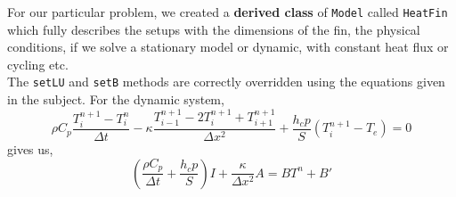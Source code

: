 \documentclass{article}
\begin{document}
For our particular problem, we created a \textbf{derived class} of \texttt{Model} called \texttt{HeatFin} which fully describes the setups with the dimensions of the fin, the physical conditions, if we solve a stationary model or dynamic, with constant heat flux or cycling etc.\\

The \texttt{setLU} and \texttt{setB} methods are correctly overridden using the equations given in the subject. For the dynamic system,\\
\begin{equation}\label{eq:heat_equation}
\rho C_p \frac{T_{i}^{n+1} - T_{i}^{n}}{\Delta t} - \kappa \frac{T_{i-1}^{n+1} - 2T_{i}^{n+1} + T_{i+1}^{n+1}}{\Delta x^2} + \frac{h_c p}{S} (T_i^{n+1} - T_e) = 0 
\end{equation}
gives us,
\begin{equation}\label{eq:matrix_equation}
\left(\frac{\rho C_p}{\Delta t} + \frac{h_c p}{S}\right) I + \frac{\kappa}{\Delta x^2} A = B T^n + B'
\end{equation}
\end{document}
